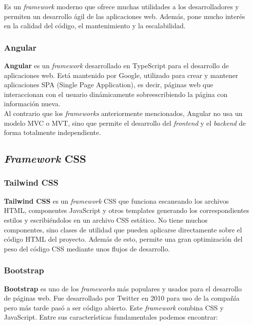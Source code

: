     Es un \textit{framework} moderno que ofrece muchas utilidades a los desarrolladores y
    permiten un desarrollo ágil de las aplicaciones web. Además, pone mucho interés en la
    calidad del código, el mantenimiento y la escalabilidad.

    \subsubsection{Angular}
    \textbf{Angular} \cite{angular} es un \textit{framework} desarrollado en TypeScript para
    el desarrollo de aplicaciones web. Está mantenido por Google, utilizado para crear y
    mantener aplicaciones SPA (Single Page Application), es decir, páginas web que
    interaccionan con el usuario dinámicamente sobreescribiendo la página con información
    nueva.\\

    Al contrario que los \textit{frameworks} anteriormente mencionados, Angular no usa un
    modelo MVC o MVT, sino que permite el desarrollo del \textit{frontend} y el \textit{backend}
    de forma totalmente independiente.

\subsection{\textit{Framework} CSS}

    \subsubsection{Tailwind CSS}
    \textbf{Tailwind CSS} \cite{tailwind-css} es un \textit{framework} CSS que funciona
    escaneando los archivos HTML, componentes JavaScript y otros templates generando los
    correspondientes estilos y escribiéndolos en un archivo CSS estático. No tiene muchos
    componentes, sino clases de utilidad que pueden aplicarse directamente sobre el código
    HTML del proyecto. Además de esto, permite una gran optimización del peso del código
    CSS mediante unos flujos de desarrollo.
        
    \subsubsection{Bootstrap}
    \textbf{Bootstrap} \cite{bootstrap} es uno de los \textit{frameworks} más populares y
    usados para el desarrollo de páginas web. Fue desarrollado por Twitter en 2010 para
    uso de la compañía pero más tarde pasó a ser código abierto. Este \textit{framework}
    combina CSS y JavaScript. Entre sus características fundamentales podemos encontrar:
    
